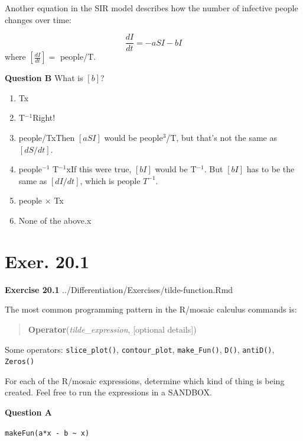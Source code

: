 \documentclass[
  letterpaper,
  DIV=11,
  numbers=noendperiod,
  oneside]{article}
\providecommand{\tightlist}{%
  \setlength{\itemsep}{0pt}\setlength{\parskip}{0pt}}\usepackage{longtable,booktabs,array}
\begin{document}
\begin{multicols}{2}
Another equation in the SIR model describes how the number of infective
people changes over time:

\[\frac{dI}{dt}  = - a S I - b I\] where \([\frac{dI}{dt}] =\) people/T.

\textbf{Question B} What is \([b]\)?

\begin{enumerate}
\def\labelenumi{\roman{enumi}.}
\tightlist
\item
  {T{x}}\\
\item
  {T\(^{-1}\){Right!~}}\\
\item
  {people/T{xThen \([a S I]\) would be people\(^3\)/T, but that's not
  the same as \([dS/dt]\).}}\\
\item
  {people\(^{-1}\) T\(^{-1}\){xIf this were true, \([bI]\) would be
  T\(^{-1}\). But \([bI]\) has to be the same as \([dI/dt]\), which is
  people \(T^{-1}\).}}\\
\item
  {people \(\times\) T{x}}\\
\item
  {None of the above.{x}}
\end{enumerate}

\hypertarget{exer.-20.1}{%
\section*{Exer. 20.1}\label{exer.-20.1}}

\textbf{Exercise 20.1} ../Differentiation/Exercises/tilde-function.Rmd

The most common programming pattern in the R/mosaic calculus commands
is:

\begin{quote}
\textbf{Operator}(\emph{tilde\_expression}, {[}optional details{]})
\end{quote}

Some operators: \texttt{slice\_plot()}, \texttt{contour\_plot},
\texttt{make\_Fun()}, \texttt{D()}, \texttt{antiD()}, \texttt{Zeros()}

For each of the R/mosaic expressions, determine which kind of thing is
being created. Feel free to run the expressions in a SANDBOX.

\textbf{Question A}

\texttt{makeFun(a*x\ -\ b\ \textasciitilde{}\ x)}


\end{multicols}
\end{document}
